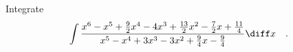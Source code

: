 \label{problemint(x^6-x^5+9/2x^4-4x^3+13/2x^2-7/2x+11/4)/(x^5-x^4+3x^3-3x^2+9/4x-9/4)dx}
Integrate
\[
\int \frac{x^{6}-x^{5}+\frac{9}{2} x^{4}-4 x^{3}+\frac{13}{2} x^{2}-\frac{7}{2} x+\frac{11}{4}}{x^{5}-x^{4}+3 x^{3}-3 x^{2}+\frac{9}{4} x-\frac{9}{4}} \diff x\quad .
\]
